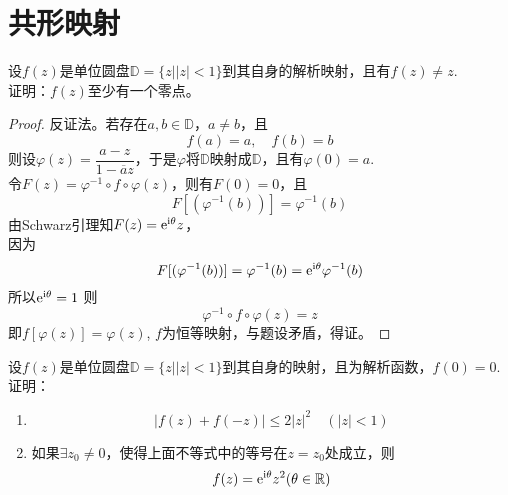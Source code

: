 \section{共形映射}

\begin{proposition}

    设$f(z)$是单位圆盘$\mathbb{D} = \{z \big| |z| < 1 \}$到其自身的解析映射，且有$f(z) \neq z$. \\
    证明：$f(z)$至少有一个零点。

\end{proposition}

\begin{proof}
    
    反证法。若存在$a, b \in \mathbb{D}$，$a \neq b$，且
    \[f(a) = a, \quad  f(b) = b\]
    则设$\varphi(z) = \dfrac{a - z}{1 - \overline{a}z}$，于是$\varphi$将$\mathbb{D}$映射成$\mathbb{D}$，且有$\varphi(0) = a$. \\
    令$F(z) = \varphi^{-1} \circ f \circ \varphi(z)$，则有$F(0) = 0$，且
    \[F[(\varphi^{-1}(b))] = \varphi^{-1}(b)\]
    由\textup{Schwarz}引理知$F(z) = \mathrm{e}^{\mathrm{i \theta}}z$，\\
    因为
    \[F[(\varphi^{-1}(b))] = \varphi^{-1}(b) = \mathrm{e}^{\mathrm{i \theta}}\varphi^{-1}(b)\]
    所以$ \mathrm{e}^{\mathrm{i \theta}} = 1$
    则
    \[ \varphi^{-1} \circ f \circ \varphi(z) = z\]
    即$ f[\varphi(z)] = \varphi(z)$, $f$为恒等映射，与题设矛盾，得证。

\end{proof}

\begin{proposition}
    
    设$f(z)$是单位圆盘$\mathbb{D} = \{z \big| |z| < 1 \}$到其自身的映射，且为解析函数，$f(0) = 0$. 证明：
    
    \begin{enumerate}
        
        \item   \[|f(z) + f(-z)| \leq 2 |z|^2 \quad (|z| < 1)\]
        
        \item   如果$\exists z_0 \neq 0$，使得上面不等式中的等号在$z = z_0$处成立，则
                \[f(z) = \mathrm{e}^{\mathrm{i}\theta}z^2(\theta \in \mathbb{{R}})\]

    \end{enumerate}

\end{proposition}

